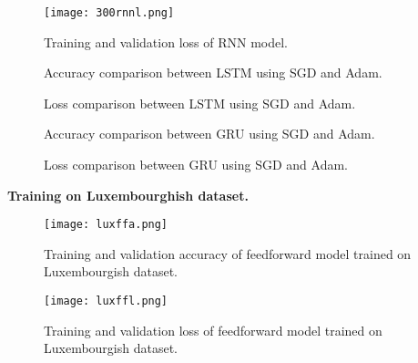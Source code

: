    \begin{figure}[h]
      \centering
      \texttt{[image: 300rnnl.png]}
      \caption{Training and validation loss of RNN model.}
      \label{300rnnl}
    \end{figure}
    \begin{figure}[H]
      \centering
      \qquad
      \caption{Accuracy comparison between LSTM using SGD and Adam.}%
      \label{lstma}
    \end{figure}
    \begin{figure}[H]
      \centering
      \qquad
      \caption{Loss comparison between LSTM using SGD and Adam.}%
      \label{lstml}
    \end{figure}
    \begin{figure}[H]
      \centering
      \qquad
      \caption{Accuracy comparison between GRU using SGD and Adam.}%
      \label{grua}
    \end{figure}
    \begin{figure}[H]
      \centering
      \qquad
      \caption{Loss comparison between GRU using SGD and Adam.}%
      \label{grul}
    \end{figure}

\textbf{Training on Luxembourghish dataset.}\\
\begin{figure}[h]
  \centering
  \texttt{[image: luxffa.png]}
  \caption{Training and validation accuracy of feedforward model trained on
  Luxembourgish dataset.}
  \label{luxffa}
\end{figure}

\begin{figure}[h]
  \centering
  \texttt{[image: luxffl.png]}
  \caption{Training and validation loss of feedforward model trained on
  Luxembourgish dataset.}
  \label{luxffl}
\end{figure}

